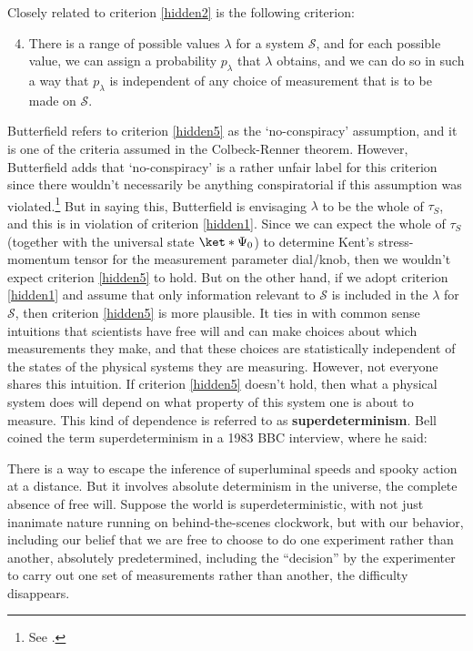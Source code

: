 \documentclass[12pt]{report}
\begin{document}
Closely related to criterion \ref{hidden2} is the following criterion: 
\begin{enumerate}
	\setcounter{enumi}{3}
	\item \label{hidden5} There is a range of possible values $\lambda$ for a system $\mathcal{S}$, and for each possible value, we can assign a probability $p_\lambda$ that $\lambda$ obtains, and we can do so in such a way that $p_\lambda$ is independent of any choice of measurement that is to be made on $\mathcal{S}$.
\end{enumerate} 
Butterfield refers to criterion \ref{hidden5} as the `no-conspiracy' assumption, and it is one of the criteria assumed in the Colbeck-Renner theorem. However, Butterfield adds that `no-conspiracy' is a rather unfair label for this criterion since there wouldn't necessarily be anything conspiratorial if this assumption was violated.\footnote{See \cite[34]{Butterfield}.} But in saying this, Butterfield is envisaging $\lambda$ to be the whole of $\tau_S$, and this is in violation of criterion \ref{hidden1}. Since we can expect the whole of $\tau_S$ (together with the universal state $\ket*{\Psi_0}$) to determine Kent's stress-momentum tensor for the measurement parameter dial/knob, then we wouldn't expect criterion \ref{hidden5} to hold. But on the other hand, if we adopt criterion \ref{hidden1} and assume that only information relevant to $\mathcal{S}$ is included in the $\lambda$ for $\mathcal{S}$, then criterion \ref{hidden5} is more plausible. It ties in with common sense intuitions that scientists have free will and can make choices about which measurements they make, and that these choices are statistically independent of the states of the physical systems they are measuring. However, not everyone shares this intuition. If criterion \ref{hidden5} doesn't hold, then what a physical system does will depend on what property of this system one is about to measure. This kind of dependence is referred to as \textbf{superdeterminism}. Bell coined the term superdeterminism in a 1983 BBC interview, where he said:  
\begin{adjustwidth}{1cm}{}
	\begin{displayquote}
		There is a way to escape the inference of superluminal speeds and spooky action at a distance. But it involves absolute determinism in the universe, the complete absence of free will. Suppose the world is superdeterministic, with not just inanimate nature running on behind-the-scenes clockwork, but with our behavior, including our belief that we are free to choose to do one experiment rather than another, absolutely predetermined, including the ``decision'' by the experimenter to carry out one set of measurements rather than another, the difficulty disappears.
	\end{displayquote}
\end{adjustwidth}
\end{document}
